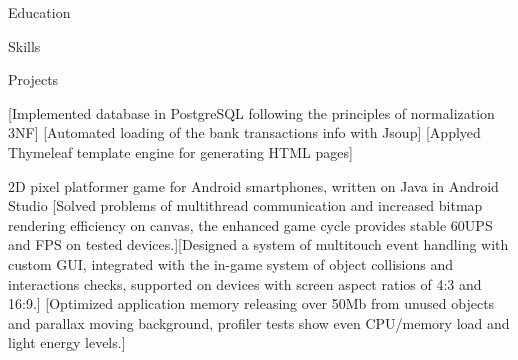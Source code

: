 \documentclass[10pt,a4paper,oneside]{letter} %
\begin{document}
	
	
	\begin{contactinfo}
	\end{contactinfo}
	
	\begin{resumeSection}{Education }


	\end{resumeSection}
	
	\begin{resumeSection}{Skills }

	\end{resumeSection}
	
	\begin{resumeSection}{Projects }

		[Implemented database in PostgreSQL following the principles of normalization 3NF]
		[Automated loading of the bank transactions info with Jsoup]
		[Applyed Thymeleaf template engine for generating HTML pages]
	    
			{2D pixel platformer game for Android smartphones, written on Java in Android Studio}
			[Solved problems of multithread communication and increased bitmap rendering efficiency on canvas, the enhanced game cycle provides stable 60UPS and FPS on tested devices.][Designed a system of multitouch event handling with custom GUI, integrated with the in-game system of object collisions and interactions checks, supported on devices with screen aspect ratios of 4:3 and 16:9.]
			[Optimized application memory releasing over 50Mb from unused objects and parallax moving background, profiler tests show even CPU/memory load and light energy levels.]
	\end{resumeSection}
	
\end{document}
